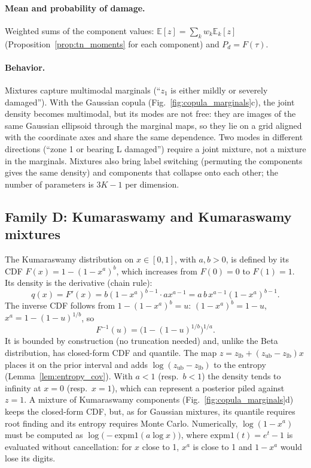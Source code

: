 \documentclass[11pt,a4paper]{article}
\numberwithin{equation}{section}
\theoremstyle{plain}
\theoremstyle{definition}
\theoremstyle{remark}
\newcommand{\E}{\mathbb{E}}
\newcommand{\zlb}{z_{\text{lb}}}
\newcommand{\zub}{z_{\text{ub}}}
\begin{document}
\paragraph{Mean and probability of damage.} Weighted sums of the component values: $\E[z]=\sum_kw_k\E_k[z]$ (Proposition~\ref{prop:tn_moments} for each component) and $P_d=F(\tau)$.

\paragraph{Behavior.} Mixtures capture multimodal marginals (``$z_1$ is either mildly or severely damaged''). With the Gaussian copula (Fig.~\ref{fig:copula_marginals}c), the joint density becomes multimodal, but its modes are not free: they are images of the same Gaussian ellipsoid through the marginal maps, so they lie on a grid aligned with the coordinate axes and share the same dependence. Two modes in different directions (``zone 1 or bearing L damaged'') require a joint mixture, not a mixture in the marginals. Mixtures also bring label switching (permuting the components gives the same density) and components that collapse onto each other; the number of parameters is $3K-1$ per dimension.

\subsection{Family D: Kumaraswamy and Kumaraswamy mixtures}
\label{sec:ks}
The Kumaraswamy distribution \cite{kumaraswamy1980} on $x\in[0,1]$, with $a,b>0$, is defined by its CDF $F(x)=1-(1-x^a)^b$, which increases from $F(0)=0$ to $F(1)=1$. Its density is the derivative (chain rule):
\begin{equation}
q(x)=F'(x)=b(1-x^a)^{b-1}\cdot ax^{a-1}=a\,b\,x^{a-1}(1-x^a)^{b-1}.
\end{equation}
The inverse CDF follows from $1-(1-x^a)^b=u$: $(1-x^a)^b=1-u$, $x^a=1-(1-u)^{1/b}$, so
\begin{equation}
F^{-1}(u)=\big(1-(1-u)^{1/b}\big)^{1/a}.
\end{equation}
It is bounded by construction (no truncation needed) and, unlike the Beta distribution, has closed-form CDF and quantile. The map $z=\zlb+(\zub-\zlb)x$ places it on the prior interval and adds $\log(\zub-\zlb)$ to the entropy (Lemma~\ref{lem:entropy_cov}). With $a<1$ (resp.\ $b<1$) the density tends to infinity at $x=0$ (resp.\ $x=1$), which can represent a posterior piled against $z=1$. A mixture of Kumaraswamy components (Fig.~\ref{fig:copula_marginals}d) keeps the closed-form CDF, but, as for Gaussian mixtures, its quantile requires root finding and its entropy requires Monte Carlo. Numerically, $\log(1-x^a)$ must be computed as $\log\big(-\mathrm{expm1}(a\log x)\big)$, where $\mathrm{expm1}(t)=e^t-1$ is evaluated without cancellation: for $x$ close to 1, $x^a$ is close to 1 and $1-x^a$ would lose its digits.
\end{document}
